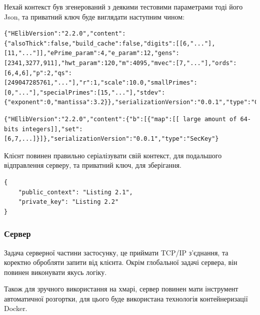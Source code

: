 Нехай контекст був згенерований з деякими тестовими параметрами тоді його Json, та приватний
ключ буде виглядати наступним чином:

\begin{lstlisting}[breaklines, caption={Json репрезентація, контексу, деякі довгі послідовносиі чисел були замінені на трикрапку, щоб зменшити кількість тексту}, 
captionpos=b]
{"HElibVersion":"2.2.0","content":{"alsoThick":false,"build_cache":false,"digits":[[6,"..."],[11,"..."]],"ePrime_param":4,"e_param":12,"gens":[2341,3277,911],"hwt_param":120,"m":4095,"mvec":[7,"..."],"ords":[6,4,6],"p":2,"qs":[249047285761,"..."],"r":1,"scale":10.0,"smallPrimes":[0,"..."],"specialPrimes":[15,"..."],"stdev":{"exponent":0,"mantissa":3.2}},"serializationVersion":"0.0.1","type":"Context"}
\end{lstlisting}

\begin{lstlisting}[breaklines, caption={Json репрезентація приватного ключа}, captionpos=b]
{"HElibVersion":"2.2.0","content":{"b":[{"map":[[ large amount of 64-bits integers]],"set":[6,7,...]}]},"serializationVersion":"0.0.1","type":"SecKey"}
\end{lstlisting}
Клієнт повинен правильно серіалізувати свій контекст, для подальшого відправлення серверу,
та приватний ключ, для зберігання.

\begin{lstlisting}[breaklines, caption={Json формат зберігання приватного контексту на 
клієнті, для можливості його подальшого використання}, captionpos=b]
{
    "public_context": "Listing 2.1",
    "private_key": "Listing 2.2"
}
\end{lstlisting}

\subsubsection*{Сервер}
Задача серверної частини застосунку, це приймати TCP/IP з'єднання, та коректно обробляти 
запити від клієнта. Окрім глобальної задачі сервера, він повинен виконувати якусь логіку.

Також для зручного використання на хмарі, сервер повинен мати інструмент автоматичної розгортки,
для цього буде використана технологія контейнеризації Docker.

